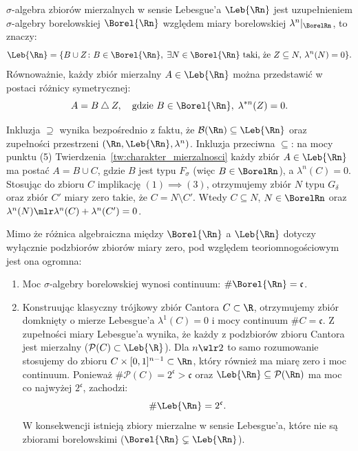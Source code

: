\begin{tw}
    $\sigma$-algebra zbiorów mierzalnych w sensie Lebesgue'a $\Leb{\Rn}$ jest uzupełnieniem $\sigma$-algebry borelowskiej $\Borel{\Rn}$ względem miary borelowskiej $\lambda^n|_{\BorelRn}$, to znaczy:
    \begin{equation*}
        \Leb{\Rn} = \{B \cup Z \colon B \in \Borel{\Rn}, \; \exists N \in \Borel{\Rn} \text{ taki, że } Z \subseteq N, \, \lambda^n(N) = 0\}.
    \end{equation*}
    Równoważnie, każdy zbiór mierzalny $A \in \Leb{\Rn}$ można przedstawić w postaci różnicy symetrycznej:
    \begin{equation*}
        A = B \mathbin{\triangle} Z, \quad \text{gdzie } B \in \Borel{\Rn}, \; \lambda^{*n}(Z) = 0.
    \end{equation*}
\end{tw}

\begin{dow}
    Inkluzja $\supseteq $ wynika bezpośrednio z faktu, że $\mathcal{B}(\Rn) \subseteq \Leb{\Rn}$ oraz zupełności przestrzeni $(\Rn, \Leb{\Rn}, \lambda^n)$.
    Inkluzja przeciwna $\subseteq$: na mocy punktu (5) Twierdzenia~\ref{tw:charakter_mierzalnosci} każdy zbiór $A \in \Leb{\Rn}$ ma postać $A = B \cup C$, gdzie $B$ jest typu $F_\sigma$ (więc $B \in \BorelRn$), a $\lambda^n(C) = 0$. Stosując do zbioru $C$ implikację $(1) \implies (3)$, otrzymujemy zbiór $N$ typu $G_\delta$ oraz zbiór $C'$ miary zero takie, że $C = N \setminus C'$. Wtedy $C \subseteq N$, $N \in \BorelRn$ oraz $\lambda^n(N) \mlr \lambda^n(C) + \lambda^n(C') = 0$.
\end{dow}

\begin{uwaga}
    Mimo że różnica algebraiczna między $\Borel{\Rn}$ a $\Leb{\Rn}$ dotyczy wyłącznie podzbiorów zbiorów miary zero, pod względem teoriomnogościowym jest ona ogromna:
    \begin{enumerate}
        \item Moc $\sigma$-algebry borelowskiej wynosi continuum: $\#\Borel{\Rn} = \mathfrak{c}$.
        \item Konstruując klasyczny trójkowy zbiór Cantora $C \subset \R$, otrzymujemy zbiór domknięty o mierze Lebesgue'a $\lambda^1(C) = 0$ i mocy continuum $\#C = \mathfrak{c}$. Z zupełności miary Lebesgue'a wynika, że każdy z podzbiorów zbioru Cantora jest mierzalny ($\mathcal{P}(C) \subset \Leb{\R}$). Dla $n \wlr 2$ to samo rozumowanie stosujemy do zbioru $C \times [0, 1]^{n-1} \subset \Rn$, który również ma miarę zero i moc continuum. Ponieważ $\#\mathcal{P}(C) = 2^\mathfrak{c} > \mathfrak{c}$ oraz $\Leb{\Rn} \subseteq \mathcal{P}(\Rn)$ ma moc co najwyżej $2^\mathfrak{c}$, zachodzi:
              \begin{equation*}
                  \#\Leb{\Rn} = 2^\mathfrak{c}.
              \end{equation*}
              W konsekwencji istnieją zbiory mierzalne w sensie Lebesgue'a, które nie są zbiorami borelowskimi ($\Borel{\Rn} \subsetneq \Leb{\Rn}$).
    \end{enumerate}
\end{uwaga}


